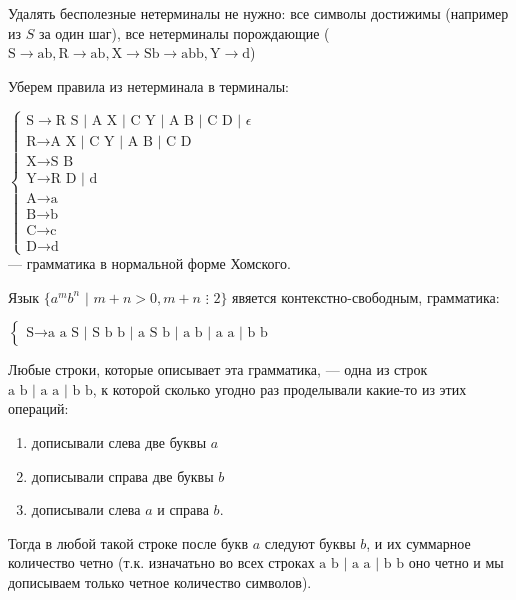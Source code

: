 \documentclass[12pt,a4paper]{scrartcl}
\begin{document}
\begin{description}
	Удалять бесполезные нетерминалы не нужно: все символы достижимы (например из $S$ за один шаг), все нетерминалы порождающие ($\text{S} \rightarrow \text{ab}, \text{R} \rightarrow \text{ab}, \text{X} \rightarrow \text{Sb} \rightarrow \text{abb}, \text{Y} \rightarrow \text{d}$)
	
	Уберем правила из нетерминала в терминалы:
	
	$\begin{cases}
		\text{S} \rightarrow \text{R S | A X | C Y | A B | C D | } \epsilon\\
		\text{R} \rightarrow \text{A X | C Y | A B | C D}\\
		\text{X} \rightarrow \text{S B}\\
		\text{Y} \rightarrow \text{R D | d}\\
		\text{A} \rightarrow \text{a}\\
		\text{B} \rightarrow \text{b}\\
		\text{C} \rightarrow \text{c}\\
		\text{D} \rightarrow \text{d}
	\end{cases}$ \\--- грамматика в нормальной форме Хомского.

	\item[\fbox{3.}] Язык $\{ a^m b^n\,\,|\,\,m + n > 0, m + n\,\,\vdots\,\, 2 \}$ явяется контекстно-свободным, грамматика:
	
	$\begin{cases}
		\text{S} \rightarrow \text{a a S | S b b | a S b | a b | a a | b b}
	\end{cases}$
	
	Любые строки, которые описывает эта грамматика, --- одна из строк $\text{a b | a a | b b}$, к которой сколько угодно раз проделывали какие-то из этих операций:
	
	\begin{enumerate}
		\item дописывали слева две буквы $a$
		
		\item дописывали справа две буквы $b$
	
		\item дописывали слева $a$ и справа $b$.
	\end{enumerate}
	
	Тогда в любой такой строке после букв $a$ следуют буквы $b$, и их суммарное количество четно (т.к. изначатьно во всех строках $\text{a b | a a | b b}$ оно четно и мы дописываем только четное количество символов).
	

\end{description}
\end{document}
